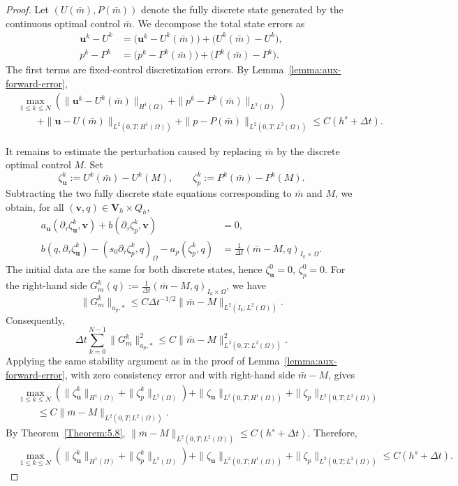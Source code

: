\documentclass{amsart}
\begin{document}
\begin{proof}
Let $(U(\bar m),P(\bar m))$ denote the fully discrete state generated by
the continuous optimal control $\bar m$. We decompose the total state
errors as
\begin{align*}
\boldsymbol u^k-U^k
&=
\bigl(\boldsymbol u^k-U^k(\bar m)\bigr)
+
\bigl(U^k(\bar m)-U^k\bigr),
\\
p^k-P^k
&=
\bigl(p^k-P^k(\bar m)\bigr)
+
\bigl(P^k(\bar m)-P^k\bigr).
\end{align*}
The first terms are fixed-control discretization errors. By
Lemma~\ref{lemma:aux-forward-error},
\[
\begin{aligned}
&\max_{1\le k\le N}
\left(
\|\boldsymbol u^k-U^k(\bar m)\|_{H^1(\Omega)}
+
\|p^k-P^k(\bar m)\|_{L^2(\Omega)}
\right)
\\
&\qquad
+
\|\boldsymbol u-U(\bar m)\|_{L^2(0,T;H^1(\Omega))}
+
\|p-P(\bar m)\|_{L^2(0,T;L^2(\Omega))}
\le
C(h^s+\Delta t).
\end{aligned}
\]

It remains to estimate the perturbation caused by replacing $\bar m$ by
the discrete optimal control $M$. Set
\[
\zeta_{\boldsymbol u}^k:=U^k(\bar m)-U^k(M),
\qquad
\zeta_p^k:=P^k(\bar m)-P^k(M).
\]
Subtracting the two fully discrete state equations corresponding to
$\bar m$ and $M$, we obtain, for all
$(\boldsymbol v,q)\in \boldsymbol V_h\times Q_h$,
\begin{align}
a_{\boldsymbol u}(\partial_\tau\zeta_{\boldsymbol u}^k,\boldsymbol v)
+
b(\partial_\tau\zeta_p^k,\boldsymbol v)
&=0,
\\
b(q,\partial_\tau\zeta_{\boldsymbol u}^k)
-
(s_0\partial_\tau\zeta_p^k,q)_\Omega
-
a_p(\zeta_p^k,q)
&=
\frac1{\Delta t}
(\bar m-M,q)_{I_k\times\Omega}.
\end{align}
The initial data are the same for both discrete states, hence
$\zeta_{\boldsymbol u}^0=0$, $\zeta_p^0=0$.
For the right-hand side $G_m^k(q):=\frac1{\Delta t}(\bar m-M,q)_{I_k\times\Omega}$,
we have
\[
\|G_m^k\|_{a_p,*}
\le
C\Delta t^{-1/2}
\|\bar m-M\|_{L^2(I_k;L^2(\Omega))}.
\]
Consequently,
\[
\Delta t\sum_{k=0}^{N-1}\|G_m^k\|_{a_p,*}^2
\le
C\|\bar m-M\|_{L^2(0,T;L^2(\Omega))}^2.
\]
Applying the same stability argument as in the proof of
Lemma~\ref{lemma:aux-forward-error}, with zero consistency error and
with right-hand side $\bar m-M$, gives
\[
\begin{aligned}
&\max_{1\le k\le N}
\left(
\|\zeta_{\boldsymbol u}^k\|_{H^1(\Omega)}
+
\|\zeta_p^k\|_{L^2(\Omega)}
\right)
+
\|\zeta_{\boldsymbol u}\|_{L^2(0,T;H^1(\Omega))}
+
\|\zeta_p\|_{L^2(0,T;L^2(\Omega))}
\\
&\qquad
\le
C
\|\bar m-M\|_{L^2(0,T;L^2(\Omega))}.
\end{aligned}
\]
By Theorem~\ref{Theorem:5.8}, $\|\bar m-M\|_{L^2(0,T;L^2(\Omega))} \le C(h^s+\Delta t)$. 
Therefore,
\[
\begin{aligned}
&\max_{1\le k\le N}
\left(
\|\zeta_{\boldsymbol u}^k\|_{H^1(\Omega)}
+
\|\zeta_p^k\|_{L^2(\Omega)}
\right)
+
\|\zeta_{\boldsymbol u}\|_{L^2(0,T;H^1(\Omega))}
+
\|\zeta_p\|_{L^2(0,T;L^2(\Omega))}
\le
C(h^s+\Delta t).
\end{aligned}
\]


\end{proof}
\end{document}
